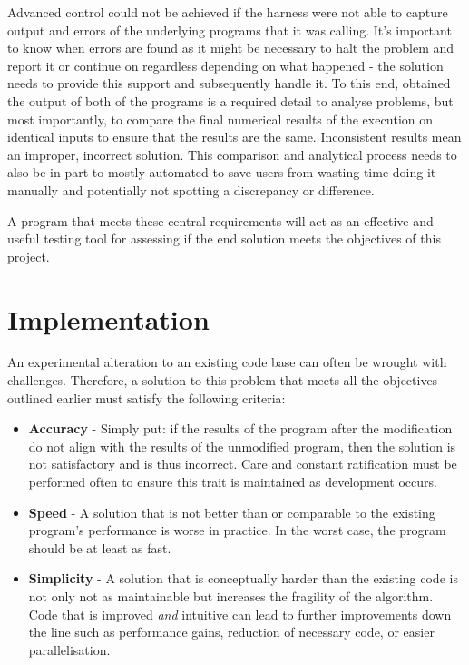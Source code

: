 \documentclass[conference]{IEEEtran}
\begin{document}
Advanced control could not be achieved if the harness were not able to capture output and errors of the underlying programs that it was calling. It's important to know when errors are found as it might be necessary to halt the problem and report it or continue on regardless depending on what happened - the solution needs to provide this support and subsequently handle it. To this end, obtained the output of both of the programs is a required detail to analyse problems, but most importantly, to compare the final numerical results of the execution on identical inputs to ensure that the results are the same. Inconsistent results mean an improper, incorrect solution. This comparison and analytical process needs to also be in part to mostly automated to save users from wasting time doing it manually and potentially not spotting a discrepancy or difference.

A program that meets these central requirements will act as an effective and useful testing tool for assessing if the end solution meets the objectives of this project.



\section{Implementation}
\label{sec:implementation}

An experimental alteration to an existing code base can often be wrought with challenges. Therefore, a solution to this problem that meets all the objectives outlined earlier must satisfy the following criteria:

\begin{itemize}
    \item \textbf{Accuracy} - Simply put: if the results of the program after the modification do not align with the results of the unmodified program, then the solution is not satisfactory and is thus incorrect. Care and constant ratification must be performed often to ensure this trait is maintained as development occurs.
    \item \textbf{Speed} - A solution that is not better than or comparable to the existing program's performance is worse in practice. In the worst case, the program should be at least as fast.
    \item \textbf{Simplicity} - A solution that is conceptually harder than the existing code is not only not as maintainable but increases the fragility of the algorithm. Code that is improved \textit{and} intuitive can lead to further improvements down the line such as performance gains, reduction of necessary code, or easier parallelisation.
\end{itemize}
\end{document}
